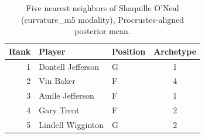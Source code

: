 \begin{table}[htbp]
  \centering\small
  \begin{tabular}{rllc}
    \toprule
    Rank & Player & Position & Archetype \\
    \midrule
    1 & Dontell Jefferson & G & 1 \\
    2 & Vin Baker & F & 4 \\
    3 & Amile Jefferson & F & 1 \\
    4 & Gary Trent & F & 2 \\
    5 & Lindell Wigginton & G & 2 \\
    \bottomrule
  \end{tabular}
  \caption{Five nearest neighbors of Shaquille O'Neal (curvature_m5 modality), Procrustes-aligned posterior mean.}
  \label{tab:Shaquille_O_Neal_neighbors_curvature_m5}
\end{table}

